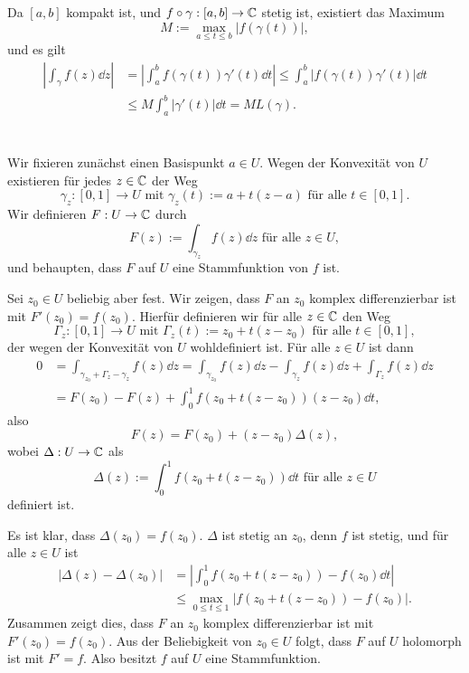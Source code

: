 \documentclass[a4paper,10pt]{article}
\begin{document}
\addtocounter{section}{1}





\section{}
Da $[a,b]$ kompakt ist, und $f \circ \gamma : [a,b] \to \mathbb{C}$ stetig ist, existiert das Maximum
\[
 M := \max_{a \leq t \leq b} |f(\gamma(t))|,
\]
und es gilt
\begin{align*}
 \left| \int_\gamma f(z) \dd{z} \right|
 &= \left| \int_a^b f(\gamma(t)) \gamma'(t) \dd{t} \right|
 \leq \int_a^b |f(\gamma(t)) \gamma'(t) | \dd{t} \\
 &\leq M \int_a^b |\gamma'(t)| \dd{t}
 = M L(\gamma).
\end{align*}





\section{}
Wir fixieren zunächst einen Basispunkt $a \in U$. Wegen der Konvexität von $U$ existieren für jedes $z \in \mathbb{C}$ der Weg
\[
 \gamma_z : [0,1] \to U \text{ mit } \gamma_z(t) := a + t(z-a) \text{ für alle } t \in [0,1].
\]
Wir definieren $F : U \to \mathbb{C}$ durch
\[
 F(z) := \int_{\gamma_z} f(z) \dd{z} \text{ für alle } z \in U,
\]
und behaupten, dass $F$ auf $U$ eine Stammfunktion von $f$ ist.

Sei $z_0 \in U$ beliebig aber fest. Wir zeigen, dass $F$ an $z_0$ komplex differenzierbar ist mit $F'(z_0) = f(z_0)$. Hierfür definieren wir für alle $z \in \mathbb{C}$ den Weg
\[
 \Gamma_z : [0,1] \to U \text{ mit } \Gamma_z(t) := z_0 + t(z-z_0) \text{ für alle } t \in [0,1],
\]
der wegen der Konvexität von $U$ wohldefiniert ist. Für alle $z \in U$ ist dann
\begin{align*}
 0
 &= \int_{\gamma_{z_0} + \Gamma_z - \gamma_z} f(z) \dd{z}
 = \int_{\gamma_{z_0}} f(z) \dd{z} - \int_{\gamma_z} f(z) \dd{z} + \int_{\Gamma_z} f(z) \dd{z} \\
 &= F(z_0) - F(z) + \int_0^1 f(z_0 + t(z-z_0))(z-z_0) \dd{t},
\end{align*}
also
\[
 F(z) = F(z_0) + (z-z_0) \Delta(z),
\]
wobei $\Delta : U \to \mathbb{C}$ als
\[
 \Delta(z) := \int_0^1 f(z_0 + t(z-z_0)) \dd{t} \text{ für alle } z \in U
\]
definiert ist.

Es ist klar, dass $\Delta(z_0) = f(z_0)$. $\Delta$ ist stetig an $z_0$, denn $f$ ist stetig, und für alle $z \in U$ ist
\begin{align*}
 |\Delta(z)-\Delta(z_0)|
 &= \left| \int_0^1 f(z_0+t(z-z_0)) - f(z_0) \dd{t} \right| \\
 &\leq \max_{0 \leq t \leq 1} |f(z_0+t(z-z_0))-f(z_0)|.
\end{align*}
Zusammen zeigt dies, dass $F$ an $z_0$ komplex differenzierbar ist mit $F'(z_0) = f(z_0)$. Aus der Beliebigkeit von $z_0 \in U$ folgt, dass $F$ auf $U$ holomorph ist mit $F' = f$. Also besitzt $f$ auf $U$ eine Stammfunktion.
\end{document}
